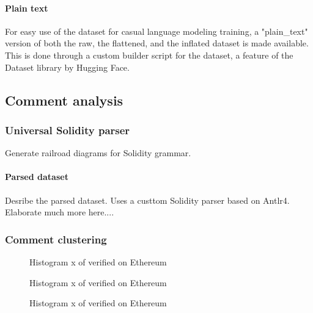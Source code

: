 \paragraph{Plain text}
\label{sec:verified-smart-contracts-plain-text}
For easy use of the dataset for casual language modeling training, a "plain\_text" version of both the raw, the flattened, and the inflated dataset is made available. This is done through a custom builder script for the dataset, a feature of the Dataset library by Hugging Face.

\subsection{Comment analysis}
\label{sec:comment-analysis}

\subsubsection{Universal Solidity parser}
\label{sec:universal-solidity-parser}

Generate railroad diagrams for Solidity grammar.

\paragraph{Parsed dataset}
\label{sec:verified-smart-contracts-parsed}
Desribe the parsed dataset. Uses a custtom Solidity parser based on  Antlr4. Elaborate much more here....



\subsubsection{Comment clustering}
\label{sec:comment-clustering}

\begin{figure}[ht]
    \centering
    
    \caption{Histogram \small x of verified  on Ethereum}
\end{figure}



\begin{figure}[ht]
    \centering
    
    \caption{Histogram \small x of verified  on Ethereum}
\end{figure}


\begin{figure}[ht]
    \centering
    
    \caption{Histogram \small x of verified  on Ethereum}
\end{figure}

